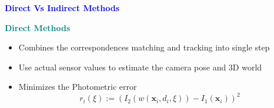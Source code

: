 \documentclass[aspectratio=169]{beamer}
\begin{document}
\begin{frame}{\textcolor{blue}{\textbf{Direct Vs Indirect Methods}}}
	\vspace{-0.5cm}

	
	\begin{block}{\textbf{\textcolor{teal}{Direct Methods}}}
	\begin{itemize}
			\item Combines the correspondences matching and tracking into single step
			\item Use actual sensor values to estimate the camera pose and 3D world
			\item Minimizes the Photometric error
			\begin{equation}
				r_i(\xi):=\left(I_2\left(w\left(\mathbf{x}_i, d_i, \xi\right)\right)-I_1\left(\mathbf{x}_i\right)\right)^2
			\end{equation}
	\end{itemize}
	

	\end{block}

\end{frame}
\end{document}
